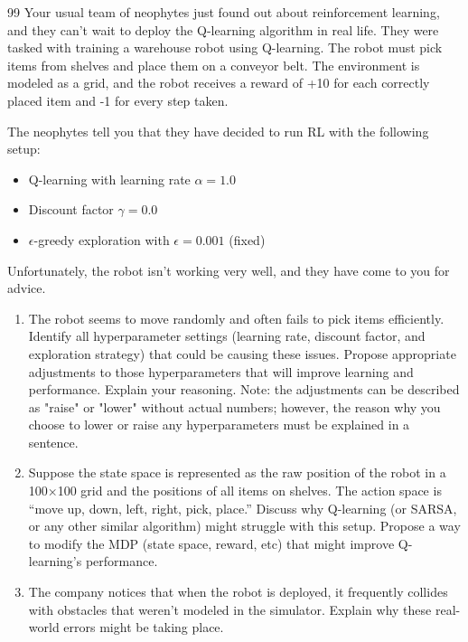 \documentclass[11pt]{article}
\begin{document}
\begin{problem}{9}{9}
Your usual team of neophytes just found out about reinforcement learning, and they can't wait to deploy the Q-learning algorithm in real life. They were tasked with training a warehouse robot using Q-learning. The robot must pick items from shelves and place them on a conveyor belt. The environment is modeled as a grid, and the robot receives a reward of +10 for each correctly placed item and -1 for every step taken.

The neophytes tell you that they have decided to run RL with the following setup:

\begin{itemize}
    \item Q-learning with learning rate $\alpha = 1.0$
    \item Discount factor $\gamma = 0.0$
    \item $\epsilon$-greedy exploration with $\epsilon = 0.001$ (fixed)
\end{itemize}

Unfortunately, the robot isn't working very well, and they have come to you for advice.

\begin{enumerate}[label=(\alph*)]
    \item The robot seems to move randomly and often fails to pick items efficiently. Identify all hyperparameter settings (learning rate, discount factor, and exploration strategy) that could be causing these issues. Propose appropriate adjustments to those hyperparameters that will improve learning and performance. Explain your reasoning. Note: the adjustments can be described as "raise" or "lower" without actual numbers; however, the reason why you choose to lower or raise any hyperparameters must be explained in a sentence.

    \item Suppose the state space is represented as the raw position of the robot in a 100×100 grid and the positions of all items on shelves. The action space is “move up, down, left, right, pick, place.” Discuss why Q-learning (or SARSA, or any other similar algorithm) might struggle with this setup. Propose a way to modify the MDP (state space, reward, etc) that might improve Q-learning's performance.

    \item The company notices that when the robot is deployed, it frequently collides with obstacles that weren’t modeled in the simulator. Explain why these real-world errors might be taking place. 

    
\end{enumerate}

\end{problem}
\end{document}
